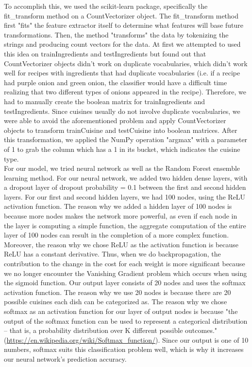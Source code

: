 \documentclass[11pt]{article}
\begin{document}
To accomplish this, we used the scikit-learn package, specifically the fit\_transform
method on a CountVectorizer object. The fit\_transform method first "fits" the
feature extractor itself to determine what features will base future transformations.
Then, the method "transforms" the data by tokenizing the strings and producing
count vectors for the data. At first
we attempted to used this idea on trainIngredients and testIngredients but found
out that CountVectorizer objects didn't work on duplicate vocabularies, which
didn't work well for recipes with ingredients that had duplicate vocabularies (i.e. if a
recipe had purple onion and green onion, the classifier would have a difficult time
realizing that two different types of onions appeared in the recipe). Therefore,
we had to manually create the boolean matrix for trainIngredients and testIngredients.
Since cuisines usually do not involve duplicate vocabularies, we were able
to avoid the aforementioned problem and apply CountVectorizer objects to transform
trainCuisine and testCuisine into boolean matrices. After this transformation, we
applied the NumPy operation "argmax" with a parameter of 1 to grab the column
which has a 1 in its bucket, which indicates the cuisine type. \\


For our model, we tried neural network as well as the Random Forest ensemble learning
method. For our neural network, we added two hidden dense layers, with a
dropout layer of dropout probability = 0.1 between the first and second hidden
layers. For our first and second hidden layers, we had 100 nodes, using the ReLU
activation function. The reason why we added a hidden layer of 100 nodes
is because more nodes makes the network more powerful, as even if
each node in the layer is computing a simple function, the aggregate computation
of the entire layer of 100 nodes can result in the completion of a more
complex function. Moreover, the reason why we chose ReLU as the activation function is because
ReLU has a constant derivative. Thus, when we do backpropagation, the contribution
to the change in the cost for each weight is more significant because
we no longer encounter the Vanishing Gradient problem which occurs when using the
sigmoid function. Our output layer consists of 20 nodes and uses the softmax
activation function. The reason why we use 20 nodes is because there are 20
possible cuisines each dish can be categorized as. The reason why we chose softmax as an activation function for our layer of
output nodes is because "the output of the softmax function can be used to
represent a categorical distribution – that is, a probability distribution
over K different possible outcomes." (\url{https://en.wikipedia.org/wiki/Softmax_function/}).
Since our output is one of 10 numbers, softmax suits this classification problem
well, which is why it increases our neural network's prediction accuracy. \\
\end{document}
